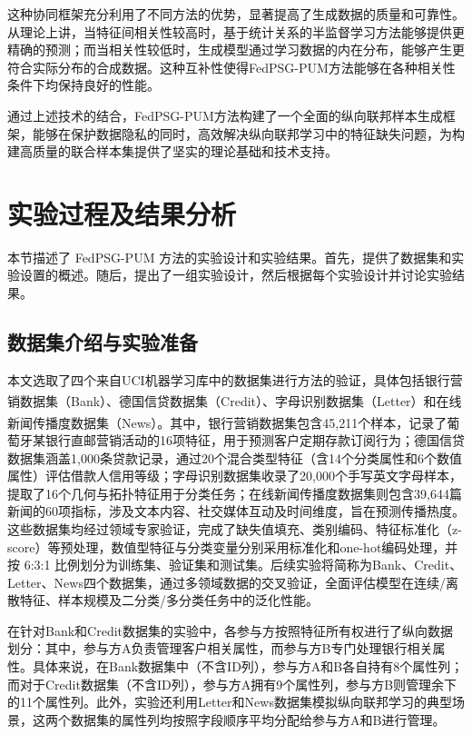 这种协同框架充分利用了不同方法的优势，显著提高了生成数据的质量和可靠性。从理论上讲，当特征间相关性较高时，基于统计关系的半监督学习方法能够提供更精确的预测；而当相关性较低时，生成模型通过学习数据的内在分布，能够产生更符合实际分布的合成数据。这种互补性使得FedPSG-PUM方法能够在各种相关性条件下均保持良好的性能。

通过上述技术的结合，FedPSG-PUM方法构建了一个全面的纵向联邦样本生成框架，能够在保护数据隐私的同时，高效解决纵向联邦学习中的特征缺失问题，为构建高质量的联合样本集提供了坚实的理论基础和技术支持。


\section{实验过程及结果分析}
本节描述了 FedPSG-PUM 方法的实验设计和实验结果。首先，提供了数据集和实验设置的概述。随后，提出了一组实验设计，然后根据每个实验设计并讨论实验结果。
\subsection{数据集介绍与实验准备} \label{subsec:data_experiment}
本文选取了四个来自UCI机器学习库中的数据集进行方法的验证，具体包括银行营销数据集（Bank）、德国信贷数据集（Credit）、字母识别数据集（Letter）\textsuperscript{\cite{serbian}}和在线新闻传播度数据集（News）\textsuperscript{\cite{news}}。其中，银行营销数据集包含45,211个样本，记录了葡萄牙某银行直邮营销活动的16项特征，用于预测客户定期存款订阅行为；德国信贷数据集涵盖1,000条贷款记录，通过20个混合类型特征（含14个分类属性和6个数值属性）评估借款人信用等级；字母识别数据集收录了20,000个手写英文字母样本，提取了16个几何与拓扑特征用于分类任务；在线新闻传播度数据集则包含39,644篇新闻的60项指标，涉及文本内容、社交媒体互动及时间维度，旨在预测传播热度。这些数据集均经过领域专家验证，完成了缺失值填充、类别编码、特征标准化（z-score）等预处理，数值型特征与分类变量分别采用标准化和one-hot编码处理，并按 6:3:1 比例划分为训练集、验证集和测试集。后续实验将简称为Bank、Credit、Letter、News四个数据集，通过多领域数据的交叉验证，全面评估模型在连续/离散特征、样本规模及二分类/多分类任务中的泛化性能。

在针对Bank和Credit数据集的实验中，各参与方按照特征所有权进行了纵向数据划分：其中，参与方A负责管理客户相关属性，而参与方B专门处理银行相关属性。具体来说，在Bank数据集中（不含ID列），参与方A和B各自持有8个属性列；而对于Credit数据集（不含ID列），参与方A拥有9个属性列，参与方B则管理余下的11个属性列。此外，实验还利用Letter和News数据集模拟纵向联邦学习的典型场景，这两个数据集的属性列均按照字段顺序平均分配给参与方A和B进行管理。

